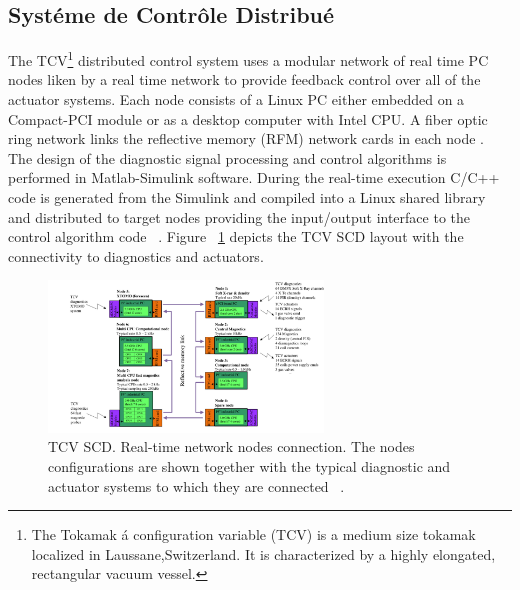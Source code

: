 \subsection{Syst\'eme de Contr\^ole Distribu\'e}

The TCV\footnote{The Tokamak \'a configuration variable (TCV) is  a medium size tokamak localized in Laussane,Switzerland. It is characterized by a highly elongated, rectangular vacuum vessel.} distributed control system uses a modular network of real time PC nodes liken by a real time network to provide feedback control over all of the actuator systems. Each node consists of a Linux PC either embedded on a Compact-PCI module or as a desktop computer with Intel CPU. A fiber optic ring network links the reflective memory (RFM) network cards in each node  \cite{TCVcntrl}.  The design of the diagnostic signal processing and control algorithms is performed in Matlab-Simulink software.  During the real-time execution  C/C++  code is generated from the Simulink and compiled  into a Linux shared library and distributed to target nodes  providing the input/output interface to the control algorithm code  ~\cite{TCVcntrl1}. Figure ~\ref{TCVcontrol} depicts the TCV SCD layout with the connectivity to diagnostics and actuators.


\begin{figure}[htbp]
	\centering
	\includegraphics[width=0.65\textwidth]{Chp2/TCVcntrl1.png}
	\caption{\label{TCVcontrol} TCV SCD. Real-time network nodes connection. The nodes configurations 	are shown together with the typical diagnostic and actuator systems to which they are connected  ~\cite{TCVcntrl1}.  }
\end{figure}

